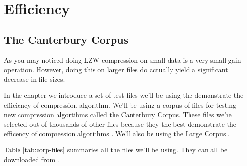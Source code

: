 \begin{refsection}
\begin{algorithm}[H]
\begin{algorithmic}[1]


      \Else
      \EndIf

      \State {}

       

      \State {}



    \EndWhile
  \end{algorithmic}
\end{algorithm}


\section{Efficiency}

\subsection{The Canterbury Corpus}

As you may noticed doing LZW compression on small data is a very small
gain operation. However, doing this on larger files do actually yield a
significant decrease in file sizes.

In the chapter we introduce a set of test files we'll be using the
demonstrate the efficiency of compression algorithm. We'll be using a
corpus of files for testing new compression algortihms called the
Canterbury Corpus. These files we're selected out of thousands of
other files because they the best demonstrate the efficency of
compression algorithms \cite{arnold:corpus}. We'll also be using the
Large Corpus \cite{powell:desc-corp}.

Table \ref{tab:corp-files} summaries all the files we'll be using. They can all be
downloaded from \cite{powell:desc-corp}.


\end{refsection}
